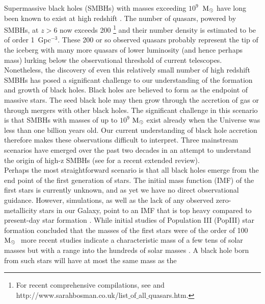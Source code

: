 \documentclass[graphics, twocolumn, usenatbib]{mn2e}
\newcommand{\msolar} {$\rm{M_{\odot}}~$}
\begin{document}
Supermassive black holes (SMBHs) with masses exceeding $10^{9}$~\msolar have long been known to
exist at high redshift \citep[e.g.][]{Fan_2001, Dietrich_2002, Fan_2003, Vestergaard_2004,
  Fan_2004, Fan_06}. The number of quasars, powered by SMBHs, at $z > 6$ now exceeds
200 \citep{Matsuoka_2019}\footnote{For recent comprehensive compilations, see \citet{Inayoshi_2020} and
http://www.sarahbosman.co.uk/list$\_$of$\_$all$\_$quasars.htm.}
and their number
density is estimated to be of order 1~Gpc$^{-3}$. These 200 or so observed quasars probably
represent the tip of the iceberg with many more quasars of lower luminosity (and hence perhaps mass)
lurking below the observational threshold of current telescopes. \\
\indent Nonetheless, the discovery of even this relatively small number of high redshift SMBHs
has posed a significant challenge to our understanding of the formation and growth of black holes.
Black holes are believed to form as the endpoint of massive stars. The seed black hole may then grow through the
accretion of gas or through mergers with other black holes. The significant challenge in this
scenario is that SMBHs with masses of up to $10^{9}$ \msolar exist \citep[e.g][]{Banados_2018} already when
the Universe was less than one billion years old. Our current understanding of black hole accretion
therefore makes these observations difficult to interpret. Three mainstream scenarios have
emerged over the past two decades in an attempt to understand the origin of high-z SMBHs (see \citealt{Inayoshi_2020} for a recent extended review). \\
\indent Perhaps the most straightforward scenario is that all black holes emerge from the end
point of the first generation of stars. The initial mass function (IMF) of the first stars
is currently unknown, and as yet we have no direct observational guidance. However, simulations,
as well as the lack of any observed zero-metallicity stars in our Galaxy, point to an IMF that
is top heavy compared to present-day star formation \citep{Yoshida_2006, Turk_2009,
  Clark_2011a, Hirano_2014}. While initial studies of Population III (PopIII) star formation
concluded that the masses of the first stars were of the order of 100 \msolar \citep{Bromm_1999,
  Abel_2002, Bromm_2002} more recent studies indicate a characteristic mass of a few tens of solar
masses but with a range into the hundreds of solar masses \citep{Stacy_2010, Stacy_2012, Stacy_2014,
  Hirano_2014,Hirano_2015}. A black hole born from such stars will have at most the same mass as the
\end{document}
